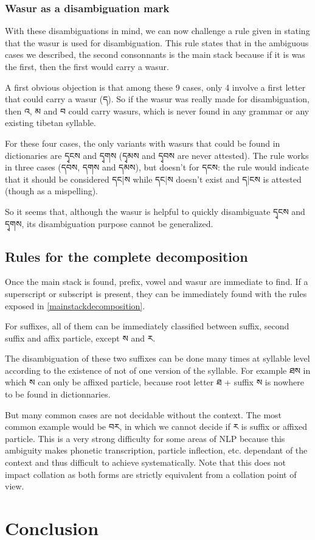 \documentclass[%
a4paper,%
pagesize,%
12pt,%
parskip=off,%
bibliography=totoc,%
numbers=noenddot,%
DIV=12,%
twoside=semi,%
headings=normal%
]{scrartcl}
\begin{document}
\subsubsection*{Wasur as a disambiguation mark}

With these disambiguations in mind, we can now challenge a rule given in \cite{MugeGrammar} stating that the wasur is used for disambiguation. This rule states that in the ambiguous cases we described, the second consonnants is the main stack because if it is was the first, then the first would carry a wasur.

A first obvious objection is that among these 9 cases, only 4 involve a first letter that could carry a wasur (ད). So if the wasur was really made for disambiguation, then འ, མ and བ could carry wasurs, which is never found in any grammar or any existing tibetan syllable.

For these four cases, the only variants with wasurs that could be found in dictionaries are དྭངས and དྭགས (དྭམས and དྭབས are never attested). The rule works in three cases (དབས, དགས and དམས), but doesn't for དངས: the rule would indicate that it should be considered དང|ས while དང|ས doesn't exist and ད|ངས is attested (though as a mispelling).

So it seems that, although the wasur is helpful to quickly disambiguate དྭངས and དྭགས, its disambiguation purpose cannot be generalized.

\subsection{Rules for the complete decomposition}

Once the main stack is found, prefix, vowel and wasur are immediate to find. If a superscript or subscript is present, they can be immediately found with the rules exposed in \ref{mainstackdecomposition}.

For suffixes, all of them can be immediately classified between suffix, second suffix and affix particle, except ས and ར. 

The disambiguation of these two suffixes can be done many times at syllable level according to the existence of not of one version of the syllable. For example ཐས in which ས can only be affixed particle, because root letter ཐ + suffix ས is nowhere to be found in dictionnaries. 

But many common cases are not decidable without the context. The most common example would be བར, in which we cannot decide if ར is suffix or affixed particle. This is a very strong difficulty for some areas of NLP because this ambiguity makes phonetic transcription, particle inflection, etc. dependant of the context and thus difficult to achieve systematically. Note that this does not impact collation as both forms are strictly equivalent from a collation point of view.

\section{Conclusion}

­



\end{document}
